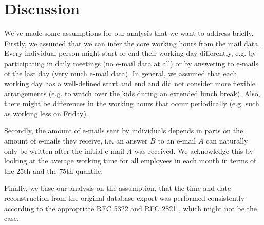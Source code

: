 \documentclass{article}
\begin{document}
\section{Discussion}
We've made some assumptions for our analysis that we want to address briefly.
Firstly, we assumed that we can infer the core working hours from the mail data.
Every individual person might start or end their working day differently, e.g.
by participating in daily meetings (no e-mail data at all) or by answering to
e-mails of the last day (very much e-mail data). In general, we assumed that
each working day has a well-defined start and end and did not consider more
flexible arrangements (e.g. to watch over the kids during an extended lunch
break). Also, there might be differences in the working hours that occur
periodically (e.g. such as working less on Friday).

Secondly, the amount of e-mails sent by individuals depends in parts on the
amount of e-mails they receive, i.e. an answer $B$ to an e-mail $A$ can naturally
only be written after the initial e-mail $A$ was received. We acknowledge this
by looking at the average working time for all employees in each month in terms
of the 25th and the 75th quantile.

Finally, we base our analysis on the assumption, that the time and date
reconstruction from the original database export was performed consistently
according to the appropriate RFC 5322 \citep{rfc5322} and RFC 2821
\citep{rfc2821}, which might not be the case.



\end{document}
